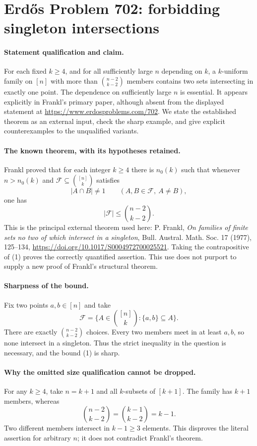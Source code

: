 \section*{Erd\H{o}s Problem 702: forbidding singleton intersections}

\paragraph{Statement qualification and claim.}
For each fixed \(k\geq4\), and for all sufficiently large \(n\)
depending on \(k\), a \(k\)-uniform family on \([n]\) with more
than \(\binom{n-2}{k-2}\) members contains two sets intersecting
in exactly one point. The dependence on sufficiently large
\(n\) is essential. It appears explicitly in Frankl's primary
paper, although absent from the displayed statement at
\url{https://www.erdosproblems.com/702}.
We state the established theorem as an external input, check
the sharp example, and give explicit counterexamples to the
unqualified variants.

\paragraph{The known theorem, with its hypotheses retained.}
Frankl proved that for each integer \(k\geq4\) there is
\(n_0(k)\) such that whenever \(n>n_0(k)\) and
\(\mathcal F\subseteq\binom{[n]}k\) satisfies
\[
 |A\cap B|\ne1\qquad(A,B\in\mathcal F,\ A\ne B),
\]
one has
\[
 |\mathcal F|\leq\binom{n-2}{k-2}.                              \tag{1}
\]
This is the principal external theorem used here:
P. Frankl, \emph{On families of finite sets no two of which
intersect in a singleton}, Bull. Austral. Math. Soc. 17 (1977),
125--134,
\url{https://doi.org/10.1017/S0004972700025521}.
Taking the contrapositive of (1) proves the correctly quantified
assertion. This use does not purport to supply a new proof of
Frankl's structural theorem.

\paragraph{Sharpness of the bound.}
Fix two points \(a,b\in[n]\) and take
\[
 \mathcal F=\{A\in\binom{[n]}k:\{a,b\}\subseteq A\}.
\]
There are exactly \(\binom{n-2}{k-2}\) choices. Every two
members meet in at least \(a,b\), so none intersect in a
singleton. Thus the strict inequality in the question is
necessary, and the bound (1) is sharp.

\paragraph{Why the omitted size qualification cannot be dropped.}
For any \(k\geq4\), take \(n=k+1\) and all \(k\)-subsets of
\([k+1]\). The family has \(k+1\) members, whereas
\[
 \binom{n-2}{k-2}=\binom{k-1}{k-2}=k-1.
\]
Two different members intersect in \(k-1\geq3\) elements.
This disproves the literal assertion for arbitrary \(n\);
it does not contradict Frankl's theorem.

